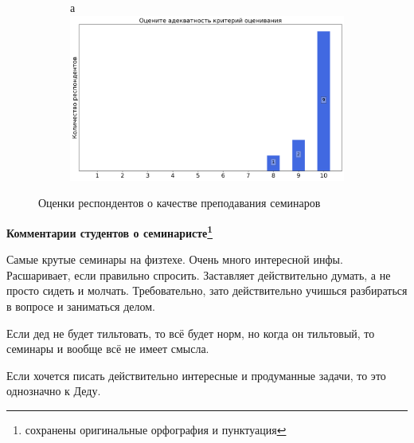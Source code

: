 \begin{figure}[H]
\begin{subfigure}[b]{0.45\textwidth}
			\end{subfigure}
			\begin{subfigure}[b]{0.45\textwidth}а
				\centering
				\includegraphics[width=\textwidth]{images/1 course/Информатика/seminarists-marks-Дединский И.Р.-3.png}
			\end{subfigure}	
			\caption{Оценки респондентов о качестве преподавания семинаров}
		\end{figure}

		\textbf{Комментарии студентов о семинаристе\protect\footnote{сохранены оригинальные орфография и пунктуация}}
            \begin{commentbox} 
                Самые крутые семинары на физтехе. Очень много интересной инфы. Расшаривает, если правильно спросить. Заставляет действительно думать, а не просто сидеть и молчать. Требовательно, зато действительно учишься разбираться в вопросе и заниматься делом. 
            \end{commentbox} 
        
            \begin{commentbox} 
                Если дед не будет тильтовать, то всё будет норм, но когда он тильтовый, то семинары и вообще всё не имеет смысла.
            \end{commentbox} 
        
            \begin{commentbox} 
                Если хочется писать действительно интересные и продуманные задачи, то это однозначно к Деду. 
            \end{commentbox}


